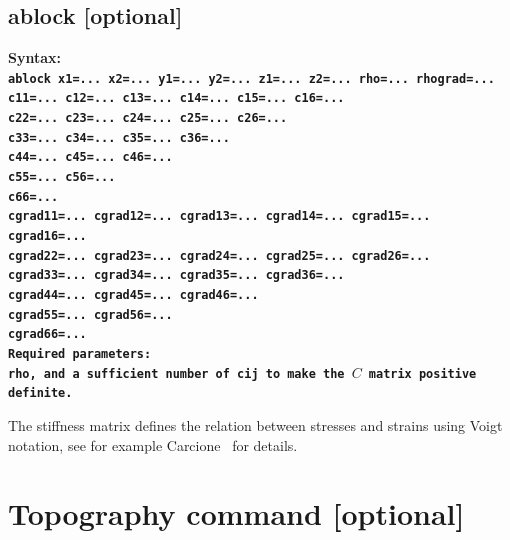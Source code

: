 \documentclass[11pt]{report}
\begin{document}
{\subsection{ablock [optional]}
\label{keyword:ablock}
\begin{flushleft}\bf
	Syntax:\\
	\tt ablock x1=... x2=... y1=... y2=... z1=... z2=... rho=... rhograd=...\\
	c11=... c12=... c13=... c14=... c15=... c16=... \\
	c22=... c23=... c24=... c25=... c26=... \\
	c33=... c34=... c35=... c36=... \\
	c44=... c45=... c46=... \\
	c55=... c56=... \\
	c66=... \\
	cgrad11=... cgrad12=... cgrad13=... cgrad14=... cgrad15=... cgrad16=... \\
	cgrad22=... cgrad23=... cgrad24=... cgrad25=... cgrad26=... \\
	cgrad33=... cgrad34=... cgrad35=... cgrad36=... \\
	cgrad44=... cgrad45=... cgrad46=... \\
	cgrad55=... cgrad56=... \\
	cgrad66=... \\
	\bf Required parameters:\\
	\tt rho, \rm and a sufficient number of \tt cij \rm to make the $C$ matrix positive definite.
\end{flushleft}
The stiffness matrix defines the relation between stresses and strains using Voigt notation, see
for example Carcione~\cite{carcione-01} for details.

\section{Topography command [optional]}

}
\end{document}

